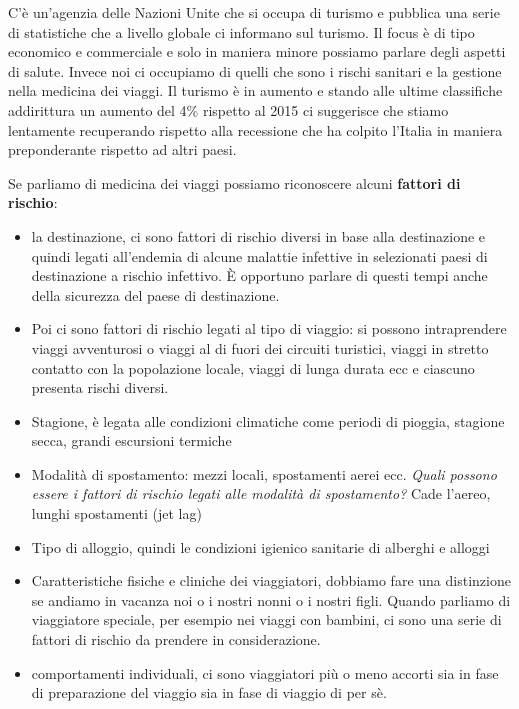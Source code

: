 C'è un'agenzia delle Nazioni Unite che si occupa di turismo e pubblica
una serie di statistiche che a livello globale ci informano sul turismo.
Il focus è di tipo economico e commerciale e solo in maniera minore
possiamo parlare degli aspetti di salute. Invece noi ci occupiamo di
quelli che sono i rischi sanitari e la gestione nella medicina dei
viaggi. Il turismo è in aumento e stando alle ultime classifiche
addirittura un aumento del 4\% rispetto al 2015 ci suggerisce che stiamo
lentamente recuperando rispetto alla recessione che ha colpito l'Italia
in maniera preponderante rispetto ad altri paesi.

Se parliamo di medicina dei viaggi possiamo riconoscere alcuni
\textbf{fattori di rischio}:\\

\begin{itemize}
\item la destinazione, ci sono fattori di rischio diversi in base alla
destinazione e quindi legati all'endemia di alcune malattie infettive in
selezionati paesi di destinazione a rischio infettivo. È opportuno
parlare di questi tempi anche della sicurezza del paese di destinazione.
\item Poi ci sono fattori di rischio legati al tipo di viaggio: si possono
intraprendere viaggi avventurosi o viaggi al di fuori dei circuiti
turistici, viaggi in stretto contatto con la popolazione locale, viaggi
di lunga durata ecc e ciascuno presenta rischi diversi.
\item Stagione, è legata alle condizioni climatiche come periodi di pioggia,
stagione secca, grandi escursioni termiche
\item Modalità di spostamento: mezzi locali, spostamenti aerei ecc.
\emph{Quali possono essere i fattori di rischio legati alle modalità di
spostamento?} Cade l'aereo, lunghi spostamenti (jet lag)
\item Tipo di alloggio, quindi le condizioni igienico sanitarie di alberghi
e alloggi
\item Caratteristiche fisiche e cliniche dei viaggiatori, dobbiamo fare una
distinzione se andiamo in vacanza noi o i nostri nonni o i nostri figli.
Quando parliamo di viaggiatore speciale, per esempio nei viaggi con
bambini, ci sono una serie di fattori di rischio da prendere in
considerazione.
\item comportamenti individuali, ci sono viaggiatori più o meno accorti sia
in fase di preparazione del viaggio sia in fase di viaggio di per sè.
\end{itemize}

